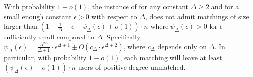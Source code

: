 \documentclass[11pt]{article}
\begin{document}
\begin{lemmarep}\label{lem:eps-mass-extremality}
With probability $1-o(1)$, the instance of  for any constant $\Delta\ge 2$ and for a small enough constant $\epsilon>0$ with respect to $\Delta$, does not admit matchings of size larger than
$
\left(1 - \frac{1}{\Delta}+\epsilon - \psi_\Delta(\epsilon) +o(1)\right)\cdot n
$
where $\psi_\Delta(\epsilon)>0$ for $\epsilon$ sufficiently small compared to $\Delta$. Specifically, $\psi_\Delta(\epsilon)=\frac{\Delta^{2\Delta}}{\Delta+1}\cdot \epsilon^{\Delta+1} \pm O\left(c_{\Delta} \cdot \epsilon^{\Delta+2}\right)$, where $c_{\Delta}$ depends only on $\Delta$. In particular,  with probability $1-o(1)$, each matching will leave  at least $(\psi_\Delta(\epsilon)-o(1)) \cdot n$ users of positive degree unmatched.\end{lemmarep}
\end{document}
